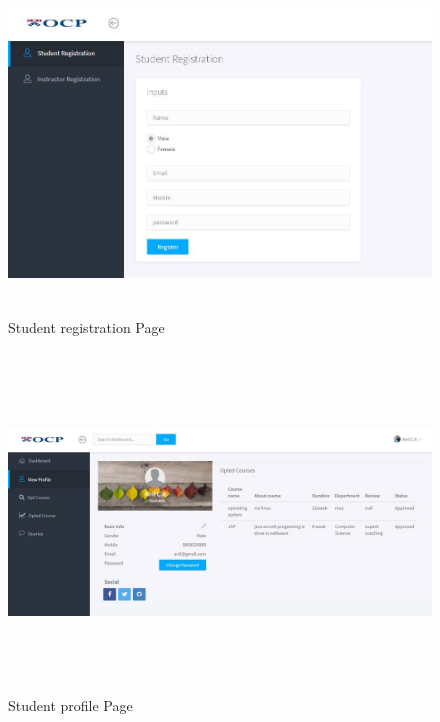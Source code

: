 \begin{figure}[!h]
	\begin{center}
		\includegraphics[height=9cm]{studentreg.jpg}
	\end{center}
\caption{Student registration Page}
\end{figure}

\begin{figure}[!h]
	\begin{center}
		\includegraphics[height=9cm,width=15cm]{studentprofile.jpg}
	\end{center}
\caption{Student profile Page}
\end{figure}

